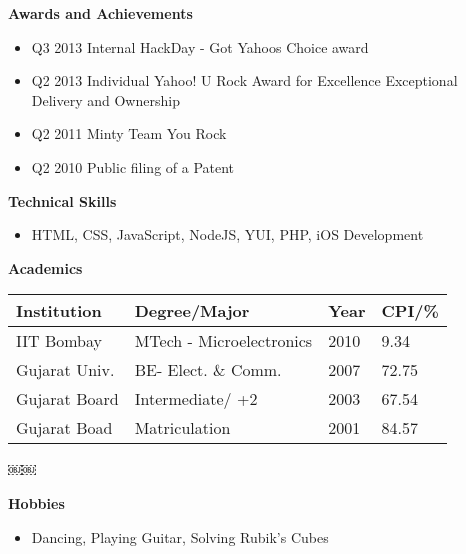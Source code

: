 \documentclass[a4paper,11pt,times]{res}
\newcommand{\smalitem}[1]{\item #1 \vspace{-4pt}}
\newcommand{\resheading}[1]{{\large \colorbox{mygrey}{\begin{minipage}{\textwidth}{\textbf{#1 \vphantom{p\^{E}}}}\end{minipage}}\vspace{4pt}}}
\begin{document}
\resheading{Awards and Achievements}
\begin{itemize}
\smalitem{Q3 2013 Internal HackDay - Got Yahoos Choice award}
\smalitem{Q2 2013 Individual Yahoo! U Rock Award for Excellence Exceptional Delivery and Ownership} 
\smalitem{Q2 2011 Minty Team You Rock}
\smalitem{Q2 2010 Public filing of a Patent}
\end{itemize}


\resheading{Technical Skills}
\begin{itemize}
\smalitem{HTML, CSS, JavaScript, NodeJS, YUI, PHP, iOS Development}
\end{itemize} 

\resheading{Academics}
\begin{tabular*}{105mm}{l l l l}
\hline
\textbf{Institution}&\textbf{Degree/Major}&\textbf{Year}&\textbf{CPI/\%}\\
\hline
IIT Bombay & MTech - Microelectronics & 2010 & 9.34\\
Gujarat Univ. & BE- Elect. \& Comm. & 2007 & 72.75\\
Gujarat Board & Intermediate/ +2 & 2003 & 67.54\\
Gujarat Boad & Matriculation & 2001 & 84.57\\
\hline
\end{tabular*}

￼￼
\resheading {Hobbies}
\begin{itemize}
\smalitem{ Dancing, Playing Guitar, Solving Rubik's Cubes}
\end{itemize}
\end{document}
